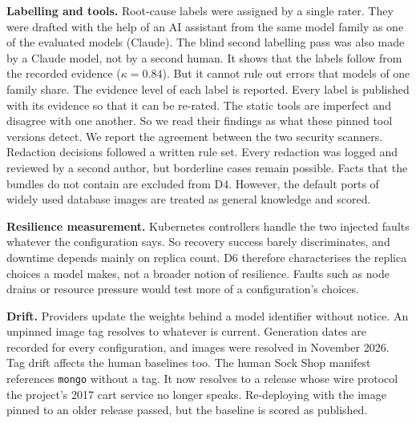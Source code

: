 \textbf{Labelling and tools.} Root-cause labels were assigned by a single rater. They were drafted with the help of an AI assistant from the same model family as one of the evaluated models (Claude). The blind second labelling pass was also made by a Claude model, not by a second human. It shows that the labels follow from the recorded evidence ($\kappa=0.84$). But it cannot rule out errors that models of one family share. The evidence level of each label is reported. Every label is published with its evidence so that it can be re-rated. The static tools are imperfect and disagree with one another. So we read their findings as what these pinned tool versions detect. We report the agreement between the two security scanners. Redaction decisions followed a written rule set. Every redaction was logged and reviewed by a second author, but borderline cases remain possible. Facts that the bundles do not contain are excluded from D4. However, the default ports of widely used database images are treated as general knowledge and scored.

\textbf{Resilience measurement.} Kubernetes controllers handle the two injected faults whatever the configuration says. So recovery success barely discriminates, and downtime depends mainly on replica count. D6 therefore characterises the replica choices a model makes, not a broader notion of resilience. Faults such as node drains or resource pressure would test more of a configuration's choices.

\textbf{Drift.} Providers update the weights behind a model identifier without notice. An unpinned image tag resolves to whatever is current. Generation dates are recorded for every configuration, and images were resolved in November 2026. Tag drift affects the human baselines too. The human Sock Shop manifest references \texttt{mongo} without a tag. It now resolves to a release whose wire protocol the project's 2017 cart service no longer speaks. Re-deploying with the image pinned to an older release passed, but the baseline is scored as published.
